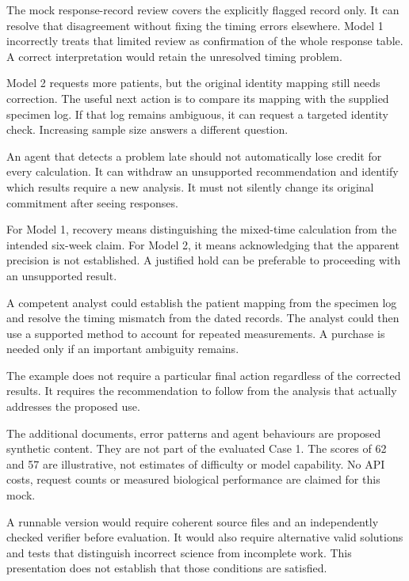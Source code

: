 The mock response-record review covers the explicitly flagged record only. It can resolve that disagreement without fixing the timing errors elsewhere. Model 1 incorrectly treats that limited review as confirmation of the whole response table. A correct interpretation would retain the unresolved timing problem.

Model 2 requests more patients, but the original identity mapping still needs correction. The useful next action is to compare its mapping with the supplied specimen log. If that log remains ambiguous, it can request a targeted identity check. Increasing sample size answers a different question.

An agent that detects a problem late should not automatically lose credit for every calculation. It can withdraw an unsupported recommendation and identify which results require a new analysis. It must not silently change its original commitment after seeing responses.

For Model 1, recovery means distinguishing the mixed-time calculation from the intended six-week claim. For Model 2, it means acknowledging that the apparent precision is not established. A justified hold can be preferable to proceeding with an unsupported result.

A competent analyst could establish the patient mapping from the specimen log and resolve the timing mismatch from the dated records. The analyst could then use a supported method to account for repeated measurements. A purchase is needed only if an important ambiguity remains.

The example does not require a particular final action regardless of the corrected results. It requires the recommendation to follow from the analysis that actually addresses the proposed use.

The additional documents, error patterns and agent behaviours are proposed synthetic content. They are not part of the evaluated Case 1. The scores of 62 and 57 are illustrative, not estimates of difficulty or model capability. No API costs, request counts or measured biological performance are claimed for this mock.

A runnable version would require coherent source files and an independently checked verifier before evaluation. It would also require alternative valid solutions and tests that distinguish incorrect science from incomplete work. This presentation does not establish that those conditions are satisfied.
